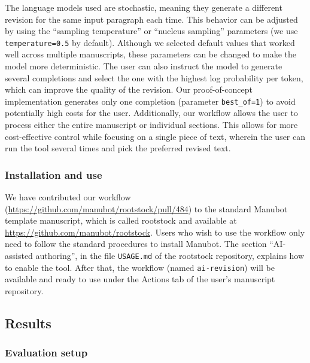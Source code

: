 \documentclass[
]{article}
\begin{document}
The language models used are stochastic, meaning they generate a different revision for the same input paragraph each time.
This behavior can be adjusted by using the ``sampling temperature'' or ``nucleus sampling'' parameters (we use \texttt{temperature=0.5} by default).
Although we selected default values that worked well across multiple manuscripts, these parameters can be changed to make the model more deterministic.
The user can also instruct the model to generate several completions and select the one with the highest log probability per token, which can improve the quality of the revision.
Our proof-of-concept implementation generates only one completion (parameter \texttt{best\_of=1}) to avoid potentially high costs for the user.
Additionally, our workflow allows the user to process either the entire manuscript or individual sections.
This allows for more cost-effective control while focusing on a single piece of text, wherein the user can run the tool several times and pick the preferred revised text.

\hypertarget{installation-and-use}{%
\subsubsection{Installation and use}\label{installation-and-use}}

We have contributed our workflow (\url{https://github.com/manubot/rootstock/pull/484}) to the standard Manubot template manuscript, which is called rootstock and available at \url{https://github.com/manubot/rootstock}.
Users who wish to use the workflow only need to follow the standard procedures to install Manubot.
The section ``AI-assisted authoring'', in the file \texttt{USAGE.md} of the rootstock repository, explains how to enable the tool.
After that, the workflow (named \texttt{ai-revision}) will be available and ready to use under the Actions tab of the user's manuscript repository.

\hypertarget{sec:results}{%
\subsection{Results}\label{sec:results}}

\hypertarget{evaluation-setup}{%
\subsubsection{Evaluation setup}\label{evaluation-setup}}
\end{document}
